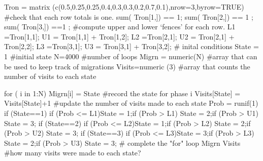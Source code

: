 Tron = matrix (c(0.5,0.25,0.25,0.4,0.3,0.3,0.2,0.7,0.1),nrow=3,byrow=TRUE)
#check that each row totals is one.
sum( Tron[1,]) == 1;  	sum( Tron[2,]) == 1 ; 	sum( Tron[3,]) ==1 ;
#compute upper and lower ‘fences’ for each row.
L1 =Tron[1,1];      	 U1 = Tron[1,1] + Tron[1,2];
L2 =Tron[2,1];      	 U2 = Tron[2,1] + Tron[2,2];
L3 =Tron[3,1]; 		U3 = Tron[3,1] + Tron[3,2];
# inital conditions
State = 1		#initial state
N=4000			#number of loops
Migrn = numeric(N)	#array that can be used to keep track of migrations
Visits=numeric (3)	#array that counts the number of visits to each state
 

for ( i in 1:N)
{
Migrn[i] = State			#record the state for phase i
Visits[State] = Visits[State]+1		#update the number of visits made to each state
Prob = runif(1)
if (State==1){ 
  	        if (Prob <= L1){State = 1};if (Prob > L1) {State = 2};if (Prob > U1) {State = 3};
	        }
 if (State==2){ 
  	        if (Prob <= L2){State = 1};if (Prob > L2) {State = 2};if (Prob > U2) {State = 3};
	     	       }
if (State==3){ 
  	        if (Prob <= L3){State = 3};if (Prob > L3) {State = 2};if (Prob > U3) {State = 3};
	     	       }
}	# complete the "for" loop
Migrn			
Visits			#how many visits were made to each state?

